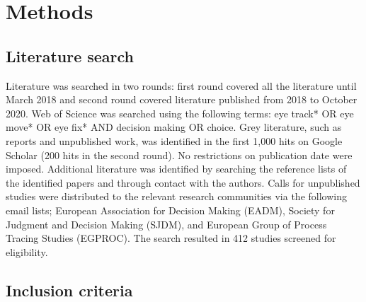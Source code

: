 
\section{Methods}


\subsection{Literature search}

Literature was searched in two rounds: first round covered all the literature until March 2018 and second round covered literature published from 2018 to October 2020. Web of Science was searched using the following terms: eye track* OR eye move* OR eye fix* AND decision making OR choice. Grey literature, such as reports and unpublished work, was identified in the first 1,000 hits on Google Scholar (200 hits in the second round). No restrictions on publication date were imposed. Additional literature was identified by searching the reference lists of the identified papers and through contact with the authors. Calls for unpublished studies were distributed to the relevant research communities via the following email lists; European Association for Decision Making (EADM), Society for Judgment and Decision Making (SJDM), and European Group of Process Tracing Studies (EGPROC). The search resulted in 412 studies screened for eligibility.


\subsection{Inclusion criteria}

